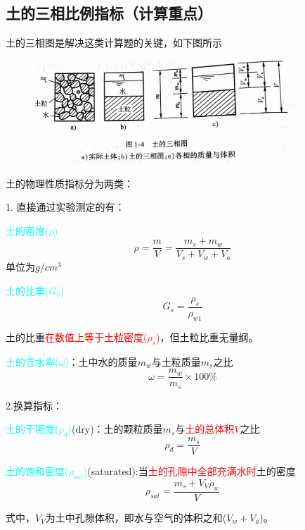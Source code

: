 \documentclass[12pt,a4paper]{ctexart}
\begin{document}
	\subsection{土的三相比例指标（计算重点）}
	土的三相图是解决这类计算题的关键，如下图所示
		\begin{figure}[htp]
			\centering
			\includegraphics[width = 10cm ]{sxt}
		\end{figure}
	
	土的物理性质指标分为两类：
	
	1. 直接通过实验测定的有：
	
	\textcolor{cyan}{土的密度($\rho$)}
		\begin{equation}
			\rho=\frac{m}{V}=\frac{m_s+m_w}{V_s+V_w+V_a}
		\end{equation}
	单位为$g/cm^3$
	
	\textcolor{cyan}{土的比重($G_s$)}
			\begin{equation}
			G_s=\frac{\rho_s}{\rho_{w1}}
			\end{equation}
		
		土的比重\textcolor{red}{在数值上等于土粒密度($\rho_s$)}，但土粒比重无量纲。
			
	\textcolor{cyan}{土的含水率($\omega$)}：土中水的质量$m_w$与土粒质量$m_s$之比
			\begin{equation}
			\omega=\frac{m_w}{m_s}\times 100\%
			\end{equation}
	
	2.换算指标：
	
	\textcolor{cyan}{土的干密度($\rho_d$)}(dry)：土的颗粒质量$m_s$与\textcolor{red}{土的总体积$V$}之比
			\begin{equation}
			\rho_d=\frac{m_s}{V}
			\end{equation}
		
	\textcolor{cyan}{土的饱和密度($\rho_{sat}$)}(saturated):当\textcolor{red}{土的孔隙中全部充满水时}土的密度
			\begin{equation}
				\rho_{sat}=\frac{m_s+V_V\rho_w}{V}
			\end{equation}
		
	式中，$V_V$为土中孔隙体积，即水与空气的体积之和($V_w+V_a$)。
	
\end{document}
